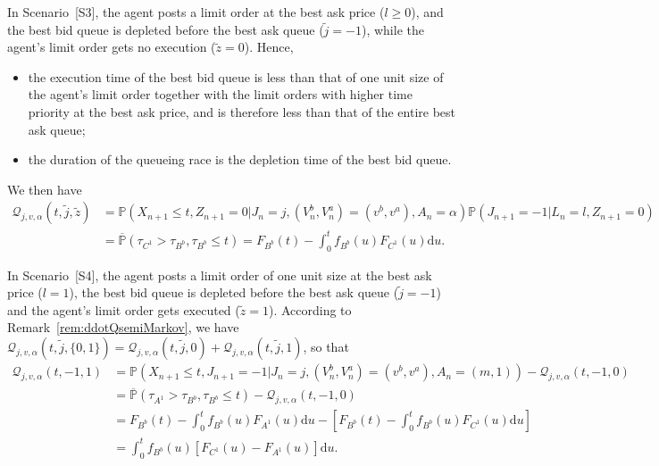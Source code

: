 \documentclass{amsart}[11pt]
\numberwithin{equation}{section}
\theoremstyle{definition}
\newcommand{\PP}{\mathbb{P}}
\newcommand{\D}{\mathrm{d}}
\newcommand{\Qq}{\mathcal{Q}}
\begin{document}
\begin{appendix}
In Scenario~[S3], the agent posts a limit order at the best ask price ($l\geq0$),
and the best bid queue is depleted before the best ask queue ($\tilde{j} = -1$), 
while the agent's limit order gets no execution ($\tilde{z} = 0$).
Hence,
\begin{itemize}
\item the execution time of the best bid queue is less than that of one unit size of the agent's limit order together with the limit orders with higher time priority at the best ask price, and is therefore less than that of the entire best ask queue;
\item the duration of the queueing race is the depletion time of the best bid queue.
\end{itemize}
We then have
\begin{align*}
{\Qq}_{j, v, \alpha}\left(t, \tilde{j}, \tilde{z}\right)
&= {\PP}\left(X_{n+1}\leq t, Z_{n+1} = 0 \Big\lvert J_n = {j}, (V^b_n, V^a_n) = ({v}^b, {v}^a), A_n = \alpha\right)
\PP\left(J_{n+1} = -1\lvert L_n = {l}, Z_{n+1} = 0\right)\\
&= \overline{\PP}\left(\tau_{{C}^{1}}>\tau_{{B}^b},\tau_{{B}^b}\leq t\right)
= F_{{B}^b}(t) - \int_0^t f_{{B}^b}(u)F_{{C}^{1}}(u)\D u.
\end{align*}

In Scenario~[S4], the agent posts a limit order of one unit size at the best ask price ($l = 1$),
the best bid queue is depleted before the best ask queue ($\tilde{j} = -1$) and the agent's limit order gets executed ($\tilde{z} = 1$).
According to Remark~\ref{rem:ddotQsemiMarkov},
we have
${\Qq}_{j, v, \alpha}\left(t, \tilde{j}, \{0, 1\}\right)
=
{\Qq}_{j, v, \alpha}\left(t, \tilde{j}, 0\right)
+
{\Qq}_{j, v, \alpha}\left(t, \tilde{j}, 1\right)$, so that
\begin{align*}
{\Qq}_{j, v, \alpha}\left(t, -1, 1\right)
 & = \PP\left(X_{n+1}\leq t, J_{n+1} = -1 \Big\lvert J_n = {j}, (V^b_n, V^a_n) = ({v}^b, {v}^a), A_n = ({m}, 1)\right)-
{\Qq}_{j, v, \alpha}\left(t, -1, 0\right)\\
 & = \overline{\PP}\left(\tau_{{A}^{1}} > \tau_{{B}^b},\tau_{{B}^b}\leq t\right)
 - {\Qq}_{j, v, \alpha}\left(t, -1, 0\right)\\
&=
F_{{B}^b}(t) - \int_0^t f_{{B}^b}(u)F_{{A}^{1}}(u)\D u
 - \left[F_{{B}^b}(t) - \int_0^t f_{{B}^b}(u)F_{{C}^1}(u)\D u\right]\\
 & = \int_0^t f_{{B}^b}(u)\left[F_{{C}^{1}}(u) - F_{{A}^{1}}(u)\right]\D u.
\end{align*}


\end{appendix}
\end{document}
